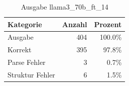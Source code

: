 
\begin{table}[!ht]
\centering
\begin{tabular}{lrr}
\toprule
\textbf{Kategorie} & \textbf{Anzahl} & \textbf{Prozent} \\
\midrule
Ausgabe & 404 & 100.0\% \\
Korrekt & 395 & 97.8\% \\
Parse Fehler & 3 & 0.7\% \\
Struktur Fehler & 6 & 1.5\% \\
\bottomrule
\end{tabular}
\caption{Ausgabe llama3_70b_ft_14}
\label{tab:file_counts}
\end{table}
    